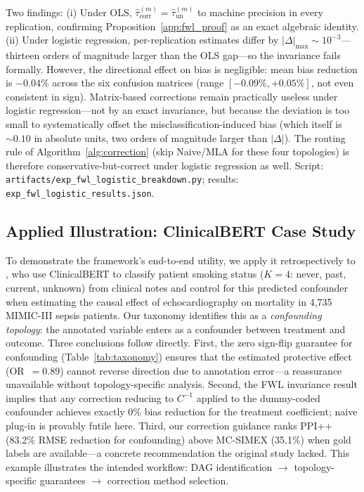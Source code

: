 Two findings: (i) Under OLS, $\hat\tau_{\mathrm{corr}}^{(m)}=\hat\tau_{\mathrm{un}}^{(m)}$ to machine precision in every replication, confirming Proposition~\ref{app:fwl_proof} as an exact algebraic identity. (ii) Under logistic regression, per-replication estimates differ by $|\Delta|_{\max}\!\sim\!10^{-3}$---thirteen orders of magnitude larger than the OLS gap---so the invariance fails formally. However, the directional effect on bias is negligible: mean bias reduction is $-0.04\%$ across the six confusion matrices (range $[-0.09\%, +0.05\%]$, not even consistent in sign). Matrix-based corrections remain practically useless under logistic regression---not by an exact invariance, but because the deviation is too small to systematically offset the misclassification-induced bias (which itself is $\sim\!0.10$ in absolute units, two orders of magnitude larger than $|\Delta|$). The routing rule of Algorithm~\ref{alg:correction} (skip Naive/MLA for these four topologies) is therefore conservative-but-correct under logistic regression as well. Script: \texttt{artifacts/exp\_fwl\_logistic\_breakdown.py}; results: \texttt{exp\_fwl\_logistic\_results.json}.

\subsection{Applied Illustration: ClinicalBERT Case Study}
\label{app:case_study}

To demonstrate the framework's end-to-end utility, we apply it retrospectively to \citet{lee_wood_doughty2024}, who use ClinicalBERT to classify patient smoking status ($K{=}4$: never, past, current, unknown) from clinical notes and control for this predicted confounder when estimating the causal effect of echocardiography on mortality in 4{,}735 MIMIC-III sepsis patients.
Our taxonomy identifies this as a \emph{confounding topology}: the annotated variable enters as a confounder between treatment and outcome.
Three conclusions follow directly.
First, the zero sign-flip guarantee for confounding (Table~\ref{tab:taxonomy}) ensures that the estimated protective effect (OR~$= 0.89$) cannot reverse direction due to annotation error---a reassurance unavailable without topology-specific analysis.
Second, the FWL invariance result implies that any correction reducing to $C^{-1}$ applied to the dummy-coded confounder achieves exactly 0\% bias reduction for the treatment coefficient; naive plug-in is provably futile here.
Third, our correction guidance ranks PPI++ (83.2\% RMSE reduction for confounding) above MC-SIMEX (35.1\%) when gold labels are available---a concrete recommendation the original study lacked.
This example illustrates the intended workflow: DAG identification $\to$ topology-specific guarantees $\to$ correction method selection.

